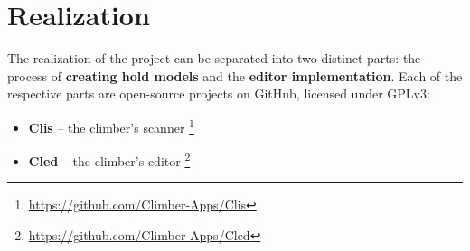 %
%
%
%
%
%

\chapter{Realization}

The realization of the project can be separated into two distinct parts: the process of \textbf{creating hold models} and the \textbf{editor implementation}. Each of the respective parts are open-source projects on GitHub, licensed under GPLv3:
\begin{itemize}
	\item \textbf{Clis} -- the climber's scanner \footnote{\url{https://github.com/Climber-Apps/Clis}}
	\item \textbf{Cled} -- the climber's editor \footnote{\url{https://github.com/Climber-Apps/Cled}}
\end{itemize}

